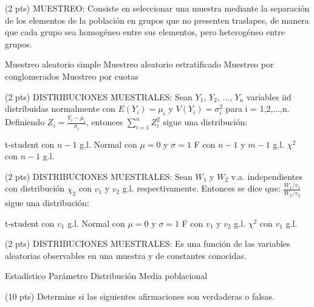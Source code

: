 \documentclass[addpoints]{exam}
\theoremstyle{mytheor}
\begin{document}
\begin{questions}
  \question (2 pts) MUESTREO:  Consiste en seleccionar una muestra mediante la separación de los elementos de la población en grupos que no presenten traslapes, de manera que cada grupo sea homogéneo entre sus elementos, pero heterogéneo entre grupos.
  
  \begin{checkboxes}
  \choice Muestreo aleatorio simple
  \choice Muestreo aleatorio estratificado
  \choice Muestreo por conglomerados
  \choice Muestreo por cuotas
  \end{checkboxes}

\question (2 pts) DISTRIBUCIONES MUESTRALES: Sean $Y_1$, $Y_2$, ..., $Y_n$ variables iid distribuidas normalmente con $E(Y_i) = \mu_i$ y $V(Y_i) = \sigma_i^2$ para i = 1,2,...,n. Definiendo $Z_i = \frac{Y_i - \mu_i}{\sigma_i}$, entonces $\sum_{i = 1}^{n} Z_i^2$ sigue una distribución:
    \begin{checkboxes}
  \choice t-student con $n-1$ g.l.
  \choice Normal con $\mu = 0$ y $\sigma = 1$ 
    \choice F con $n-1$ y $m-1$ g.l.
  \choice $\chi^2$ con $n-1$ g.l.
  \end{checkboxes}
  
  
  \question (2 pts) DISTRIBUCIONES MUESTRALES: Sean $W_1$ y $W_2$ v.a. independientes con distribución $\chi_2$ con $v_1$ y $v_2$ g.l. respectivamente. Entonces se dice que: $\frac{W_1/v_1}{W_2/v_2}$ sigue una distribución:
    
    \begin{checkboxes}
  \choice t-student con $v_1$ g.l.
  \choice Normal con $\mu = 0$ y $\sigma = 1$ 
    \choice F con $v_1$ y $v_2$ g.l.
  \choice $\chi^2$ con $v_1$ g.l.
  \end{checkboxes}
  
  \question (2 pts) DISTRIBUCIONES MUESTRALES: Es una función de las variables aleatorias observables en una muestra y de constantes conocidas.
  
  \begin{checkboxes}
  \choice Estadístico 
  \choice Parámetro
  \choice Distribución
  \choice Media poblacional
  \end{checkboxes}
  
  \question (10 pts) Determine si las siguientes afirmaciones son verdaderas o falsas.
  

\end{questions}
\end{document}
